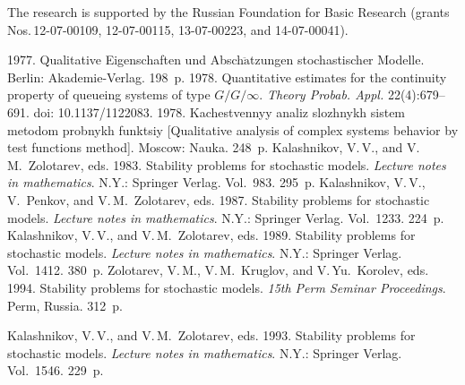 
\Ack
\noindent
The research is supported by the Russian Foundation for Basic Research (grants 
Nos.\,12-07-00109, 12-07-00115, 13-07-00223, and
14-07-00041).

\begin{multicols}{2}

\renewcommand{\bibname}{\protect\rmfamily References}

{\small\frenchspacing
{%
\begin{thebibliography}{99}


 1977. Qualitative Eigenschaften und Absch$\ddot{\mbox{a}}$tzungen
stochastischer Modelle. Berlin: Akademie-Verlag. 198~p.
 1978. Quantitative estimates for the continuity property
of queueing systems of type $G/G/\infty$. \textit{Theory Probab. Appl.} 22(4):679--691.
doi: 10.1137/1122083.
 1978.
Kachestvennyy analiz slozhnykh sistem metodom probnykh funktsiy
[Qualitative analysis of complex systems behavior by test functions method].
Moscow: Nauka. 248~p.
Kalashnikov, V.\,V., and V.\,M.~Zolotarev, eds. 1983.
Stability problems for stochastic models. \textit{Lecture notes in mathematics}.
N.Y.: Springer Verlag. Vol.~983. 295~p.
Kalashnikov, V.\,V., V.~Penkov, and V.\,M.~Zolotarev, eds.
1987. Stability problems for stochastic models.
\textit{Lecture notes in mathematics}.  N.Y.: Springer Verlag. Vol.~1233. 224~p.
Kalashnikov, V.\,V., and V.\,M.~Zolotarev, eds. 1989.
Stability problems for stochastic models. \textit{Lecture notes in mathematics}.
 N.Y.: Springer Verlag. Vol.~1412. 380~p.
Zolotarev, V.\,M., V.\,M.~Kruglov, and V.\,Yu.~Korolev, eds.
1994. Stability problems for stochastic models.
\textit{15th Perm Seminar Proceedings}. Perm, Russia. 312~p.

Kalashnikov, V.\,V., and V.\,M.~Zolotarev, eds.
1993. Stability problems for stochastic models. \textit{Lecture notes in mathematics}.
 N.Y.: Springer Verlag. Vol.~1546. 229~p.


\end{thebibliography}}}
\end{multicols}

